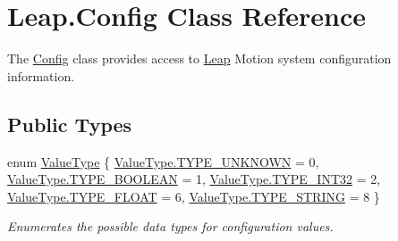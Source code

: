 \hypertarget{class_leap_1_1_config}{}\section{Leap.\+Config Class Reference}
\label{class_leap_1_1_config}


The \mbox{\hyperlink{class_leap_1_1_config}{Config}} class provides access to \mbox{\hyperlink{namespace_leap}{Leap}} Motion system configuration information.  


\subsection*{Public Types}
\begin{DoxyCompactItemize}
\item 
enum \mbox{\hyperlink{class_leap_1_1_config_aee9819af7eacacc324aa72619310a9d8}{Value\+Type}} \{ \newline
\mbox{\hyperlink{class_leap_1_1_config_aee9819af7eacacc324aa72619310a9d8acc25e6802810879f48a8f1f6dff41a81}{Value\+Type.\+T\+Y\+P\+E\+\_\+\+U\+N\+K\+N\+O\+WN}} = 0, 
\mbox{\hyperlink{class_leap_1_1_config_aee9819af7eacacc324aa72619310a9d8a6181a96e10a89f8326a3e447c466fee4}{Value\+Type.\+T\+Y\+P\+E\+\_\+\+B\+O\+O\+L\+E\+AN}} = 1, 
\mbox{\hyperlink{class_leap_1_1_config_aee9819af7eacacc324aa72619310a9d8acb371c8e73f04b5f4a77a8a7cd8354d4}{Value\+Type.\+T\+Y\+P\+E\+\_\+\+I\+N\+T32}} = 2, 
\mbox{\hyperlink{class_leap_1_1_config_aee9819af7eacacc324aa72619310a9d8aa843db71574642fec855366d785d0a14}{Value\+Type.\+T\+Y\+P\+E\+\_\+\+F\+L\+O\+AT}} = 6, 
\newline
\mbox{\hyperlink{class_leap_1_1_config_aee9819af7eacacc324aa72619310a9d8ac8d746edee2e78b43d0db005850f11f8}{Value\+Type.\+T\+Y\+P\+E\+\_\+\+S\+T\+R\+I\+NG}} = 8
 \}
\begin{DoxyCompactList}\small\item\em Enumerates the possible data types for configuration values. \end{DoxyCompactList}\end{DoxyCompactItemize}
